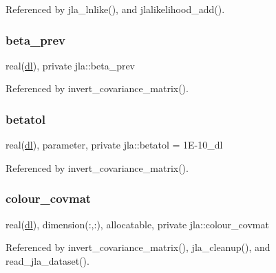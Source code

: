 Referenced by jla\+\_\+lnlike(), and jlalikelihood\+\_\+add().

\mbox{\label{namespacejla_a6ce045a151cda5e7f1d37adeac58eb4d}} 
\subsubsection{\texorpdfstring{beta\+\_\+prev}{beta\_prev}}
{\footnotesize\ttfamily real(\mbox{\hyperlink{namespacejla_a3aa6435b4e08f1d532390186ac608741}{dl}}), private jla\+::beta\+\_\+prev\hspace{0.3cm}{\ttfamily [private]}}



Referenced by invert\+\_\+covariance\+\_\+matrix().

\mbox{\label{namespacejla_a5ef48a10dbf7795c2f5d30b11434bbd4}} 
\subsubsection{\texorpdfstring{betatol}{betatol}}
{\footnotesize\ttfamily real(\mbox{\hyperlink{namespacejla_a3aa6435b4e08f1d532390186ac608741}{dl}}), parameter, private jla\+::betatol = 1\+E-\/10\+\_\+dl\hspace{0.3cm}{\ttfamily [private]}}



Referenced by invert\+\_\+covariance\+\_\+matrix().

\mbox{\label{namespacejla_a3b95b3e7a5ea31feba90bf7c9b9e8fc6}} 
\subsubsection{\texorpdfstring{colour\+\_\+covmat}{colour\_covmat}}
{\footnotesize\ttfamily real(\mbox{\hyperlink{namespacejla_a3aa6435b4e08f1d532390186ac608741}{dl}}), dimension(\+:,\+:), allocatable, private jla\+::colour\+\_\+covmat\hspace{0.3cm}{\ttfamily [private]}}



Referenced by invert\+\_\+covariance\+\_\+matrix(), jla\+\_\+cleanup(), and read\+\_\+jla\+\_\+dataset().

